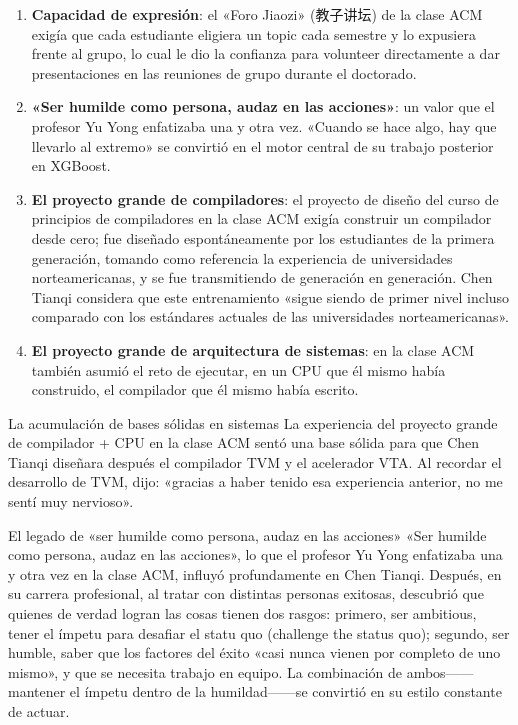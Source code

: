 \documentclass[a4paper]{article}
\begin{document}
\begin{enumerate}
    \item \textbf{Capacidad de expresión}: el «Foro Jiaozi» (教子讲坛) de la clase ACM exigía que cada estudiante eligiera un topic cada semestre y lo expusiera frente al grupo, lo cual le dio la confianza para volunteer directamente a dar presentaciones en las reuniones de grupo durante el doctorado.
    \item \textbf{«Ser humilde como persona, audaz en las acciones»}: un valor que el profesor Yu Yong enfatizaba una y otra vez. «Cuando se hace algo, hay que llevarlo al extremo» se convirtió en el motor central de su trabajo posterior en XGBoost.
    \item \textbf{El proyecto grande de compiladores}: el proyecto de diseño del curso de principios de compiladores en la clase ACM exigía construir un compilador desde cero; fue diseñado espontáneamente por los estudiantes de la primera generación, tomando como referencia la experiencia de universidades norteamericanas, y se fue transmitiendo de generación en generación. Chen Tianqi considera que este entrenamiento «sigue siendo de primer nivel incluso comparado con los estándares actuales de las universidades norteamericanas».
    \item \textbf{El proyecto grande de arquitectura de sistemas}: en la clase ACM también asumió el reto de ejecutar, en un CPU que él mismo había construido, el compilador que él mismo había escrito.
\end{enumerate}

\begin{importantbox}{La acumulación de bases sólidas en sistemas}
La experiencia del proyecto grande de compilador + CPU en la clase ACM sentó una base sólida para que Chen Tianqi diseñara después el compilador TVM y el acelerador VTA. Al recordar el desarrollo de TVM, dijo: «gracias a haber tenido esa experiencia anterior, no me sentí muy nervioso».
\end{importantbox}

\begin{importantbox}{El legado de «ser humilde como persona, audaz en las acciones»}
«Ser humilde como persona, audaz en las acciones», lo que el profesor Yu Yong enfatizaba una y otra vez en la clase ACM, influyó profundamente en Chen Tianqi. Después, en su carrera profesional, al tratar con distintas personas exitosas, descubrió que quienes de verdad logran las cosas tienen dos rasgos: primero, ser ambitious, tener el ímpetu para desafiar el statu quo (challenge the status quo); segundo, ser humble, saber que los factores del éxito «casi nunca vienen por completo de uno mismo», y que se necesita trabajo en equipo. La combinación de ambos------mantener el ímpetu dentro de la humildad------se convirtió en su estilo constante de actuar.
\end{importantbox}
\end{document}
